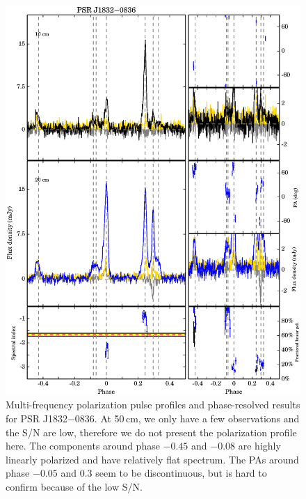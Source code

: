 \documentclass[useAMS,usenatbib]{mn2e}
\begin{document}
\begin{appendix}
\begin{figure}
\begin{center}
\includegraphics[width=6 in]{1832.ps}
\caption{Multi-frequency polarization pulse profiles and phase-resolved results for PSR J1832$-$0836. 
At 50\,cm, we only have a few observations and the S/N are low, therefore 
we do not present the polarization profile here.
%
The components around phase $-0.45$ and $-0.08$ are highly linearly polarized 
and have relatively flat spectrum. 
%
The PAs around phase $-0.05$ and $0.3$ seem to be discontinuous, but is hard 
to confirm because of the low S/N.
}
\label{1832}
\end{center}
\end{figure}


\end{appendix}
\end{document}
